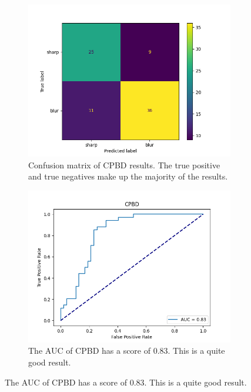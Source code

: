 \begin{figure}[H]
    \centering
    \begin{subfigure}[t]{0.49\textwidth}
        \centering
        \includegraphics[width=\textwidth]{Figures/BlurredImages/output_cpbd_conf_mat.png}
        \caption{Confusion matrix of CPBD results. The true positive and true negatives make up the majority of the results.}
        \label{fig:hf_conf_mat}
    \end{subfigure}
    \hfill
    \begin{subfigure}[t]{0.49\textwidth}
        \centering
        \includegraphics[width=\textwidth]{Figures/BlurredImages/output_cpbd_roc.png}
        \caption{The AUC of CPBD has a score of 0.83. This is a quite good result.}

\end{subfigure}
\end{figure}
